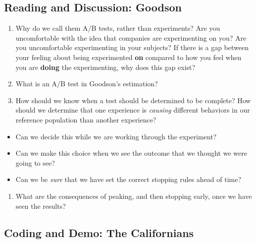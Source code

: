 \documentclass[
]{article}
\providecommand{\tightlist}{%
  \setlength{\itemsep}{0pt}\setlength{\parskip}{0pt}}
\begin{document}
\hypertarget{reading-and-discussion-goodson}{%
\subsection{Reading and Discussion: Goodson}\label{reading-and-discussion-goodson}}

\begin{enumerate}
\def\labelenumi{\arabic{enumi}.}
\tightlist
\item
  Why do we call them A/B tests, rather than experiments? Are you uncomfortable with the idea that companies are experimenting on you? Are you uncomfortable experimenting in your subjects? If there is a gap between your feeling about being experimented \textbf{on} compared to how you feel when you are \textbf{doing} the experimenting, why does this gap exist?
\item
  What is an A/B test in Goodson's estimation?
\item
  How should we know when a test should be determined to be complete? How should we determine that one experience is \emph{causing} different behaviors in our reference population than another experience?
\end{enumerate}

\begin{itemize}
\tightlist
\item
  Can we decide this while we are working through the experiment?
\item
  Can we make this choice when we see the outcome that we thought we were going to see?
\item
  Can we be \emph{sure} that we have set the correct stopping rules ahead of time?
\end{itemize}

\begin{enumerate}
\def\labelenumi{\arabic{enumi}.}
\setcounter{enumi}{3}
\tightlist
\item
  What are the consequences of peaking, and then stopping early, once we have seen the results?
\end{enumerate}

\hypertarget{coding-and-demo-the-californians}{%
\subsection{Coding and Demo: The Californians}\label{coding-and-demo-the-californians}}
\end{document}
